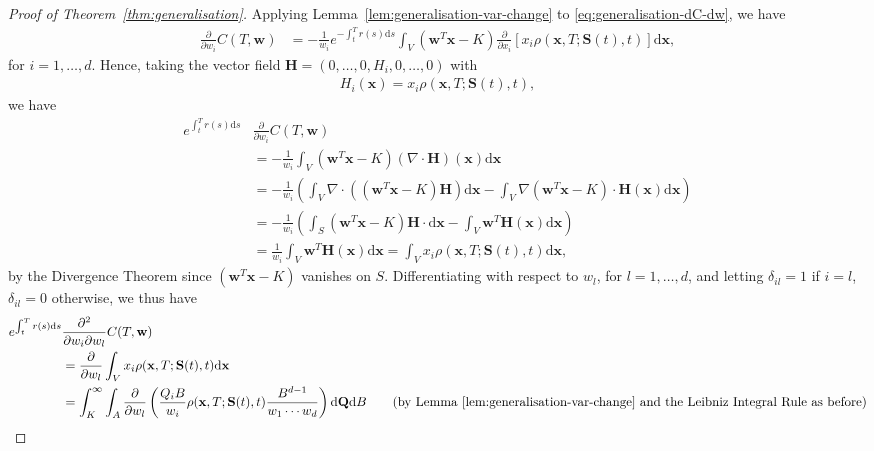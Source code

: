 \documentclass[english]{article}
\numberwithin{equation}{section}
\numberwithin{figure}{section}
\theoremstyle{bolddescit}
\theoremstyle{definition}
\theoremstyle{definition}
\theoremstyle{plain}
\theoremstyle{plain}
\theoremstyle{bolddesc}
\theoremstyle{plain}
\theoremstyle{remark}
\begin{document}
\begin{proof}[Proof of Theorem~\ref{thm:generalisation}]
  Applying Lemma~\ref{lem:generalisation-var-change} to \eqref{eq:generalisation-dC-dw}, we have
  \begin{align*}
    \frac{\partial}{\partial w_i} C(T,\mathbf{w})
    &= - \frac{1}{w_i}e^{-\int_t^T r(s) \mathrm{d}s}
    \int_V \left(\mathbf{w}^T \mathbf{x} - K\right) \frac{\partial}{\partial x_i}\left[x_i \rho(\mathbf{x},T;\mathbf{S}(t),t) \right] \mathrm{d}\mathbf{x},
  \end{align*}
  for $i=1,\ldots,d$. Hence, taking the vector field $\mathbf{H} = (0,\ldots,0,H_i,0,\ldots,0)$ with
  \begin{align*}
    H_i(\mathbf{x}) = x_i \rho(\mathbf{x},T;\mathbf{S}(t),t),
  \end{align*}
  we have
  \begin{align*}
    e^{\int_t^T r(s) \mathrm{d}s} &\frac{\partial}{\partial w_i} C(T,\mathbf{w})\\
    &= - \frac{1}{w_i} \int_V \left(\mathbf{w}^T \mathbf{x} - K\right) (\nabla \cdot \mathbf{H})(\mathbf{x}) \mathrm{d}\mathbf{x}\\
    &= - \frac{1}{w_i} \left( \int_V \nabla \cdot ((\mathbf{w}^T \mathbf{x} - K) \mathbf{H}) \mathrm{d}\mathbf{x} - \int_V \nabla (\mathbf{w}^T \mathbf{x} - K) \cdot \mathbf{H}(\mathbf{x}) \mathrm{d}\mathbf{x} \right)\\
    &= - \frac{1}{w_i} \left( \int_S (\mathbf{w}^T \mathbf{x} - K) \mathbf{H} \cdot \mathrm{d}\mathbf{x} - \int_V \mathbf{w}^T \mathbf{H}(\mathbf{x}) \mathrm{d}\mathbf{x} \right)\\
    &= \frac{1}{w_i} \int_V \mathbf{w}^T \mathbf{H}(\mathbf{x}) \mathrm{d}\mathbf{x}
    = \int_V x_i \rho(\mathbf{x},T;\mathbf{S}(t),t) \mathrm{d}\mathbf{x},
  \end{align*}
  by the Divergence Theorem since $(\mathbf{w}^T \mathbf{x} - K)$ vanishes on $S$. Differentiating with respect to $w_l$, for $l=1,\ldots,d$, and letting $\delta_{il} = 1$ if $i=l$, $\delta_{il} = 0$ otherwise, we thus have
  \begin{align*}
    e^{\int_t^T r(s) \mathrm{d}s} &\frac{\partial^2}{\partial w_i \partial w_l} C(T,\mathbf{w})\\
    &= \frac{\partial}{\partial w_l} \int_V x_i \rho(\mathbf{x},T;\mathbf{S}(t),t) \mathrm{d}\mathbf{x}\\
    &= \int_K^\infty \int_A \frac{\partial}{\partial w_l} \left(\frac{Q_i B}{w_i} \rho(\mathbf{x},T;\mathbf{S}(t),t) \frac{B^{d-1}}{w_1 \cdots w_d} \right) \mathrm{d}\mathbf{Q} \mathrm{d}B \tag{by Lemma~\ref{lem:generalisation-var-change} and the Leibniz Integral Rule as before}\\

\end{align*}
\end{proof}
\end{document}
